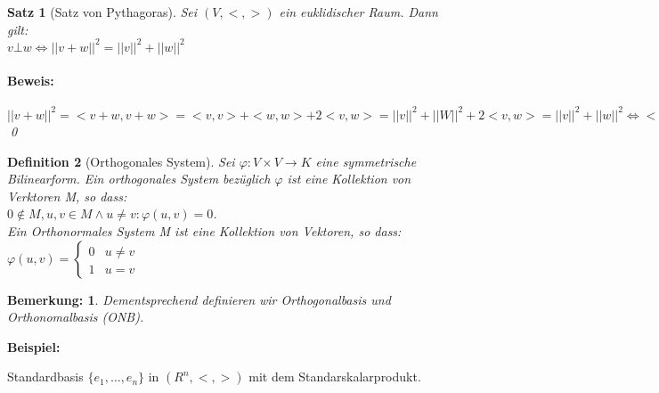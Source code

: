 \documentclass{report}
\newenvironment{beispiel} {
\textbf{Beispiel:}\hfill\break
}{}
\theoremstyle{customrem}
\newtheorem*{bemerkung}{Bemerkung\textnormal:}
\theoremstyle{customdef}
\newtheorem{definition}{Definition}[chapter]
\newtheorem{satz}[definition]{Satz}
\renewenvironment{proof}{\paragraph{Beweis: }}{\qed}
\theoremstyle{customenv}
\begin{document}
\begin{satz}[Satz von Pythagoras]
  Sei \((V, <, >)\) ein euklidischer Raum. Dann gilt:\\
  \(v \bot w \Leftrightarrow ||v+w||^2 = ||v||^2 + ||w||^2\)\\
  \begin{proof}
    \(||v + w||^2 = <v + w, v + w>
    = <v, v> + <w, w> + 2 <v, w>
    = ||v||^2 + ||W||^2 + 2<v, w> = ||v||^2 + ||w||^2
    \Leftrightarrow <v, w> = 0 \Leftrightarrow v \bot w\)
  \end{proof}
\end{satz}

\begin{definition}[Orthogonales System]
  Sei \(\varphi : V \times V \to K\) eine symmetrische Bilinearform.
  Ein orthogonales System bez\"uglich \(\varphi\) ist eine Kollektion von
  Verktoren M, so dass:\\
  \(
  0 \not\in M, u, v \in M \land u \neq v : \varphi(u, v) = 0
  \).\\
  Ein Orthonormales System M ist eine Kollektion von Vektoren, so dass:\\
  \(
    \varphi(u, v) = \begin{cases}0 & u \neq v \\ 1 & u = v\end{cases}
  \)
\end{definition}

\begin{bemerkung}
  Dementsprechend definieren wir Orthogonalbasis und Orthonomalbasis (ONB).
\end{bemerkung}

\begin{beispiel}
  Standardbasis \(\{e_1, \dots, e_n\}\) in \((R^n, <, >)\) mit dem
  Standarskalarprodukt.
\end{beispiel}
\end{document}
